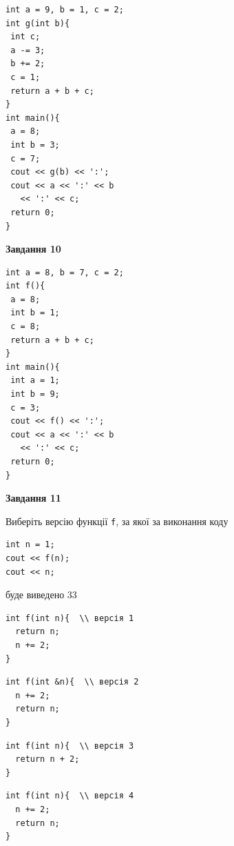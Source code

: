 \documentclass[12pt, ukrainian]{article}
\def\code#1{\Verb!#1!}
\begin{document}
{\begin {large}
\begin{minipage}[t]{7.0cm}
\begin{verbatim}
int a = 9, b = 1, c = 2;
int g(int b){
 int c;
 a -= 3;
 b += 2;
 c = 1;
 return a + b + c;
}
int main(){
 a = 8;
 int b = 3;
 c = 7;
 cout << g(b) << ':';
 cout << a << ':' << b 
   << ':' << c;
 return 0;
}
\end{verbatim}



\begin{center}
\textbf{Завдання 10}
\end{center}
\vspace{-8mm}

\begin{verbatim}
int a = 8, b = 7, c = 2;
int f(){
 a = 8;
 int b = 1;
 c = 8;
 return a + b + c;
}
int main(){
 int a = 1;
 int b = 9;
 c = 3;
 cout << f() << ':';
 cout << a << ':' << b 
   << ':' << c;
 return 0;
}
\end{verbatim}

\end{minipage}
\vline \hspace{1mm}
\begin{minipage}[t]{11.0cm}

\begin{center}
\textbf{Завдання 11}
\end{center}
Виберіть версію функції \code{f}, за якої за виконання коду
\begin{verbatim}
int n = 1;
cout << f(n);
cout << n;
\end{verbatim}

буде виведено 33

\begin{verbatim}
int f(int n){  \\ версія 1
  return n;
  n += 2;
}
\end{verbatim}

\vspace{-8mm}\begin{verbatim}
int f(int &n){  \\ версія 2
  n += 2;
  return n;
}
\end{verbatim}

\vspace{-8mm}\begin{verbatim}
int f(int n){  \\ версія 3
  return n + 2;
}
\end{verbatim}

\vspace{-8mm}\begin{verbatim}
int f(int n){  \\ версія 4
  n += 2;
  return n;
}
\end{verbatim}




\end{minipage}
\end{large}}
\end{document}

